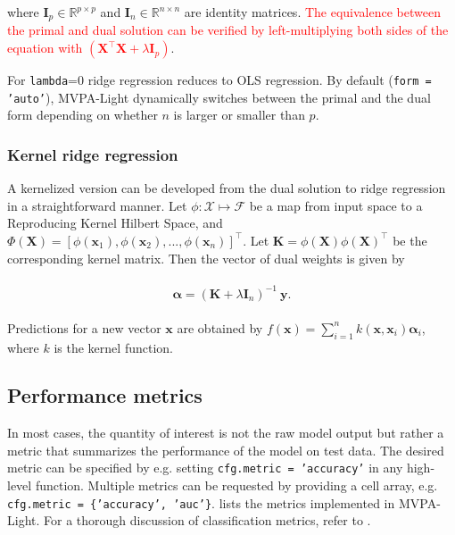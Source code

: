 \documentclass[utf8]{frontiersSCNS} %
\newcommand{\al}{\boldsymbol{\alpha}}
\newcommand{\x}{\mathbf{x}}
\newcommand{\y}{\mathbf{y}}
\newcommand{\I}{\mathbf{I}}
\newcommand{\K}{\mathbf{K}}
\newcommand{\R}{\mathbb{R}}
\newcommand{\X}{\mathbf{X}}
\newcommand{\ttt}[1]{\texttt{#1}}
\newcommand{\red}[1]{\textcolor{red}{#1}}
\begin{document}
where $\I_p\in\R^{p\times p}$ and $\I_n\in\R^{n\times n}$ are identity matrices. \red{The equivalence between the primal and dual solution can be verified by left-multiplying both sides of the equation with $(\X^\top\X + \lambda\I_p)$}.


For \ttt{lambda}=0 ridge regression reduces to OLS regression. By default (\ttt{form = 'auto'}), MVPA-Light dynamically switches between the primal and the dual form depending on whether $n$ is larger or smaller than $p$.

\subsubsection{Kernel ridge regression}

A kernelized version can be developed from the dual solution to ridge regression in a straightforward manner. Let $\phi:\mathcal{X}\mapsto\mathcal{F}$ be a map from input space to a Reproducing Kernel Hilbert Space, and $\Phi(\X) = [\phi(\x_1),\phi(\x_2),...,\phi(\x_n)]^\top$. Let $\K = \phi(\X)\phi(\X)^\top$ be the corresponding kernel matrix. Then the vector of dual weights is given by

\begin{align}
\begin{split}
\label{eq:kernel_ridge}
\al = (\K + \lambda\I_n)^{-1}\ \y.
\end{split}
\end{align}

Predictions for a new vector $\x$ are obtained by $f(\x) = \sum_{i=1}^n k(\x, \x_i)\al_i$, where $k$ is the kernel function.


\subsection{Performance metrics}\label{sec:metrics}

In most cases, the quantity of interest is not the raw model output but rather a metric that summarizes the performance of the model on test data. The desired metric can be specified by e.g. setting \ttt{cfg.metric = 'accuracy'} in any high-level function. Multiple metrics can be requested by providing a cell array, e.g. \ttt{cfg.metric = \{'accuracy', 'auc'\}}.  lists the metrics implemented in MVPA-Light. For a thorough discussion of classification metrics, refer to  \cite{Sokolova2009ATasks}.
\end{document}
